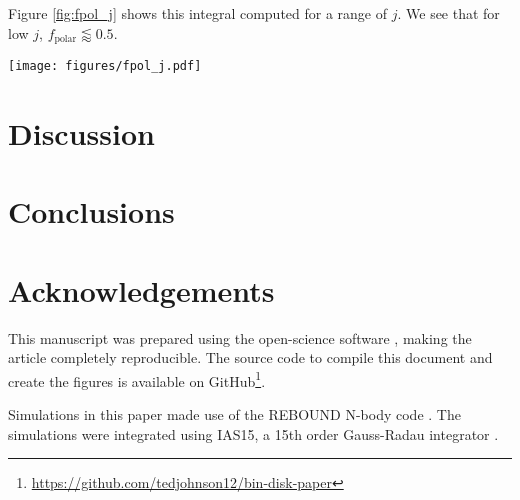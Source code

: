 \documentclass[twocolumn]{aastex631}
\newcommand\ghurl[0]{\url{https://github.com/tedjohnson12/bin-disk-paper}}
\begin{document}
Figure \ref{fig:fpol_j} shows this integral computed for a range of $j$. We see that for low $j$, $f_\text{polar} \lessapprox 0.5$.

\begin{figure*}
    \centering
    \texttt{[image: figures/fpol\_j.pdf]}
    \caption{
        Polar fraction $f_\text{polar}$ upper limit as a function of normalized disk angular momentum $j$. These simulations assume a population of binary systems with constant $j$, random $e_\text{b}$, and disks whose angular momentum vectors are distributed isotropically with respect to the binary angular momentum. These values were computed using the analytic technique described in Section \ref{sec:analytic}.
    }
    \label{fig:fpol_j}
\end{figure*}


\section{Discussion}
\label{sec:discussion}

\section{Conclusions}
\label{sec:conclusions}





\section{Acknowledgements}
\label{sec:ack}

This manuscript was prepared using the open-science software \href{https://show-your.work/en/latest/intro/}{\showyourwork} \citep{luger2021}, making the article completely
reproducible. The source code to compile this document and create the figures is available on GitHub\footnote{\ghurl}.

Simulations in this paper made use of the REBOUND N-body code \citep{rebound}.
The simulations were integrated using IAS15, a 15th order Gauss-Radau integrator \citep{reboundias15}. 



\end{document}
